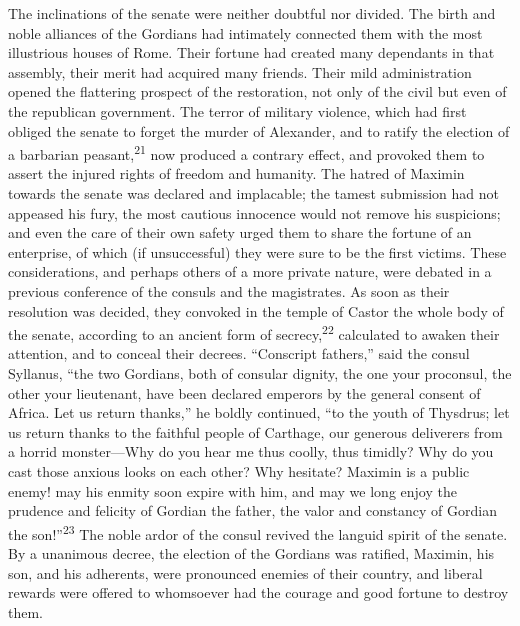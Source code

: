 
The inclinations of the senate were neither doubtful nor divided.
The birth and noble alliances of the Gordians had intimately
connected them with the most illustrious houses of Rome. Their
fortune had created many dependants in that assembly, their merit
had acquired many friends. Their mild administration opened the
flattering prospect of the restoration, not only of the civil but
even of the republican government. The terror of military
violence, which had first obliged the senate to forget the murder
of Alexander, and to ratify the election of a barbarian peasant,\textsuperscript{21}
now produced a contrary effect, and provoked them to assert
the injured rights of freedom and humanity. The hatred of Maximin
towards the senate was declared and implacable; the tamest
submission had not appeased his fury, the most cautious innocence
would not remove his suspicions; and even the care of their own
safety urged them to share the fortune of an enterprise, of which
(if unsuccessful) they were sure to be the first victims. These
considerations, and perhaps others of a more private nature, were
debated in a previous conference of the consuls and the
magistrates. As soon as their resolution was decided, they
convoked in the temple of Castor the whole body of the senate,
according to an ancient form of secrecy,\textsuperscript{22} calculated to awaken
their attention, and to conceal their decrees. “Conscript
fathers,” said the consul Syllanus, “the two Gordians, both of
consular dignity, the one your proconsul, the other your
lieutenant, have been declared emperors by the general consent of
Africa. Let us return thanks,” he boldly continued, “to the youth
of Thysdrus; let us return thanks to the faithful people of
Carthage, our generous deliverers from a horrid monster—Why do
you hear me thus coolly, thus timidly? Why do you cast those
anxious looks on each other? Why hesitate? Maximin is a public
enemy! may his enmity soon expire with him, and may we long enjoy
the prudence and felicity of Gordian the father, the valor and
constancy of Gordian the son!”\textsuperscript{23} The noble ardor of the consul
revived the languid spirit of the senate. By a unanimous decree,
the election of the Gordians was ratified, Maximin, his son, and
his adherents, were pronounced enemies of their country, and
liberal rewards were offered to whomsoever had the courage and
good fortune to destroy them.



